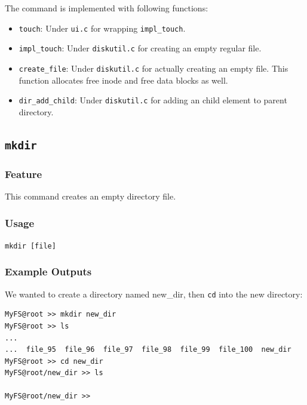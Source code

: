 \documentclass{homework}
\begin{document}
The command is implemented with following functions:
\begin{itemize}
    \item \texttt{touch}: Under \texttt{ui.c} for wrapping \texttt{impl_touch}.
    \item \texttt{impl_touch}: Under \texttt{diskutil.c} for creating an empty regular file.
    \item \texttt{create_file}: Under \texttt{diskutil.c} for actually creating an empty file. This function allocates free inode and free data blocks as well.
    \item \texttt{dir_add_child}: Under \texttt{diskutil.c} for adding an child element to parent directory.
\end{itemize}


\pagebreak

\subsection{\texttt{mkdir}}
\subsubsection{Feature}
This command creates an empty directory file.
\subsubsection{Usage}
\begin{center}
\texttt{mkdir [file]}
\end{center}

\subsubsection{Example Outputs}
We wanted to create a directory named new\_dir, then \texttt{cd} into the new directory:
\\
\begin{center}
\begin{code}
\begin{verbatim}
MyFS@root >> mkdir new_dir
MyFS@root >> ls
...
...  file_95  file_96  file_97  file_98  file_99  file_100  new_dir
MyFS@root >> cd new_dir
MyFS@root/new_dir >> ls

MyFS@root/new_dir >>
\end{verbatim}
\end{code}
\end{center}
\end{document}
